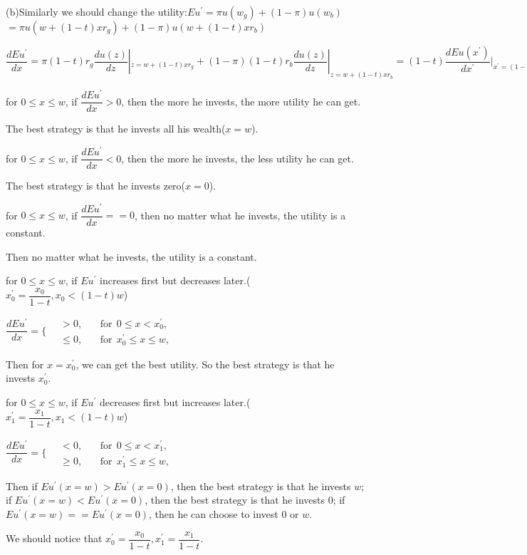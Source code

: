 \documentclass[a4 paper,12pt]{article}
\begin{document}
\par (b)Similarly we should change the utility:$Eu^{\prime}=\pi u(w_{g})+(1-\pi )u(w_{b})$\\$=\pi u(w+(1-t)xr_{g})+(1-\pi)u(w+(1-t)xr_{b})$
\par $\dfrac{dEu^{\prime}}{dx}=\pi(1-t) r_{g}\dfrac{du(z)}{dz}|_{z=w+(1-t)xr_{g}}+(1-\pi)(1-t)r_{b}\dfrac{du(z)}{dz}|_{z=w+(1-t)xr_{b}}=(1-t)\dfrac{dEu(x^{\prime})}{dx^{\prime}}|_{x^{\prime}=(1-t)x}$
\par {} for $0\le x\le w$, if $\dfrac{dEu^{\prime}}{dx}>0$, then the more he invests, the more utility he can get.
\par The best strategy is that he invests all his wealth($x=w$).
\par {} for $0\le x\le w$, if $\dfrac{dEu^{\prime}}{dx}<0$, then the more he invests, the less utility he can get.
\par The best strategy is that he invests zero($x=0$). 
\par {} for $0\le x\le w$, if $\dfrac{dEu^{\prime}}{dx}==0$, then no matter what he invests, the utility is a constant.
\par Then no matter what he invests, the utility is a constant. 
\par {}for $0\le x\le w$, if $Eu^{\prime}$ increases first but decreases later.($x_{0}^{\prime}=\dfrac{x_{0}}{1-t},x_{0}<(1-t)w$)
\par $\dfrac{dEu^{\prime}}{dx}=
		\bigg\lbrace
		\begin{aligned}\,
			& >0, \,
			&&\text{for}\ \ 0\le x<x_{0}^{\prime}, \\[-.5ex]
			& \le 0, 
			&&\text{for}\ \ x_{0}^{\prime}\le x\le w,
		\end{aligned}$
\par Then for $x=x_{0}^{\prime}$, we can get the best utility. So the best strategy is that he invests $x_{0}^{\prime}$.
\par {}for $0\le x\le w$, if $Eu^{\prime}$ decreases first but increases later.($x_{1}^{\prime}=\dfrac{x_{1}}{1-t},x_{1}<(1-t)w$)
\par $\dfrac{dEu^{\prime}}{dx}=
		\bigg\lbrace
		\begin{aligned}\,
			& <0, \,
			&&\text{for}\ \ 0\le x<x_{1}^{\prime}, \\[-.5ex]
			& \ge 0, 
			&&\text{for}\ \ x_{1}^{\prime}\le x\le w,
		\end{aligned}$
\par Then if $Eu^{\prime}(x=w)>Eu^{\prime}(x=0)$, then the best strategy is that he invests $w$; if $Eu^{\prime}(x=w)<Eu^{\prime}(x=0)$, then the best strategy is that he invests $0$; if $Eu^{\prime}(x=w)==Eu^{\prime}(x=0)$, then he can choose to invest 0 or $w$.
\par We should notice that $x_{0}^{\prime}=\dfrac{x_{0}}{1-t},x_{1}^{\prime}=\dfrac{x_{1}}{1-t}$.
\end{document}
